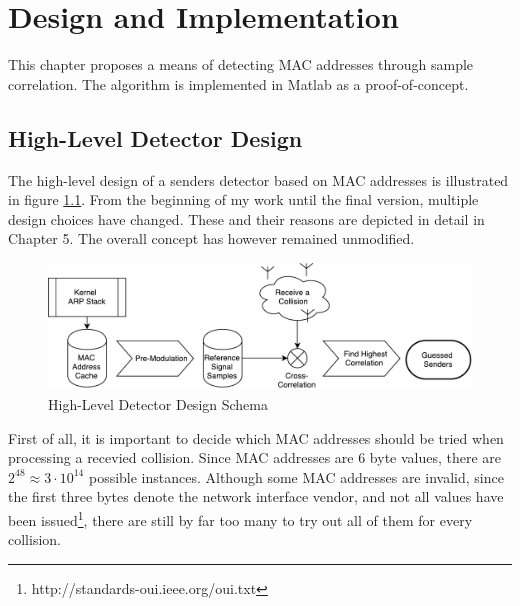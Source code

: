 
\chapter{Design and Implementation}\label{ch:design}
\glsresetall %

This chapter proposes a means of detecting \gls{MAC} addresses through sample correlation. The algorithm is implemented in Matlab as a proof-of-concept.



\section{High-Level Detector Design}

The high-level design of a senders detector based on \gls{MAC} addresses is illustrated in figure \ref{fig:blockdesign}. From the beginning of my work until the final version, multiple design choices have changed. These and their reasons are depicted in detail in Chapter 5. The overall concept has however remained unmodified.

\begin{figure}[H]
	\centering
	\includegraphics[width=\textwidth]{gfx/images/detector-block-design}
	\caption[High-Level Detector Design Schema]{High-Level Detector Design Schema}
	\label{fig:blockdesign}
\end{figure}

First of all, it is important to decide which \gls{MAC} addresses should be tried when processing a recevied collision. Since \gls{MAC} addresses are 6 byte values, there are $2^{48} \approx 3 \cdot 10^{14}$ possible instances. Although some \gls{MAC} addresses are invalid, since the first three bytes denote the network interface vendor, and not all values have been issued\footnote{http://standards-oui.ieee.org/oui.txt}, there are still by far too many to try out all of them for every collision.

